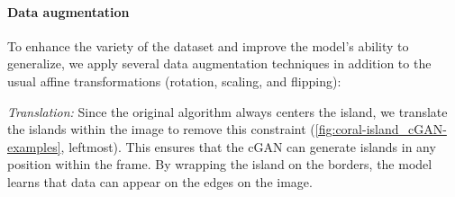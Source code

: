
\paragraph{Data augmentation}


To enhance the variety of the dataset and improve the model's ability to generalize, we apply several data augmentation techniques in addition to the usual affine transformations (rotation, scaling, and flipping):

        \textit{Translation:} Since the original algorithm always centers the island, we translate the islands within the image to remove this constraint (\cref{fig:coral-island_cGAN-examples}, leftmost). This ensures that the cGAN can generate islands in any position within the frame. By wrapping the island on the borders, the model learns that data can appear on the edges on the image.


